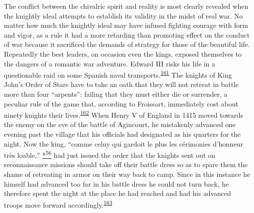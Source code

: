 The conflict between the chivalric spirit and reality is most clearly
revealed when the knightly ideal attempts to establish its validity in
the midst of real war. No matter how much the knightly ideal may have
infused fighting courage with form and vigor, as a rule it had a more
retarding than promoting effect on the conduct of war because it
sacrificed the demands of strategy for those of the beautiful life.
Repeatedly the best leaders, on occasion even the kings, exposed
themselves to the dangers of a romantic war adventure. Edward III risks
his life in a questionable raid on some Spanish naval
transports.\textsuperscript{\protect\hypertarget{10_Chapter_Three__THE_HEROIC_DREAM.xhtmlux5cux23id_1614}{\protect\hyperlink{23_NOTES.xhtmlux5cux23id_1615}{161}}}
The knights of King John's Order of Stars have to take an oath that they
will not retreat in battle more than four ``arpents''; failing that they
must either die or surrender, a peculiar rule of the game that,
according to Froissart, immediately cost about ninety knights their
lives.\textsuperscript{\protect\hypertarget{10_Chapter_Three__THE_HEROIC_DREAM.xhtmlux5cux23id_1612}{\protect\hyperlink{23_NOTES.xhtmlux5cux23id_1613}{162}}}
When Henry V of England in 1415 moved towards the enemy on the eve of
the battle of Agincourt, he mistakenly advanced one evening past the
village that his officials had designated as his quarters for the night.
Now the king, ``comme celuy qui gardoit le plus les cérimonies d'honneur
très loable,''
\protect\hypertarget{10_Chapter_Three__THE_HEROIC_DREAM.xhtmlux5cux23id_2899}{\protect\hyperlink{23_NOTES.xhtmlux5cux23id_2900}{*\textsuperscript{56}}}
had just issued the order that the knights sent out on reconnaissance
missions should take off their battle dress so as to spare them the
shame of retreating in armor on their way back to camp. Since in this
instance he himself had advanced too far in his battle dress he could
not turn back, he therefore spent the night at the place he had reached
and had his advanced troops move forward
accordingly.\textsuperscript{\protect\hypertarget{10_Chapter_Three__THE_HEROIC_DREAM.xhtmlux5cux23id_1610}{\protect\hyperlink{23_NOTES.xhtmlux5cux23id_1611}{163}}}

